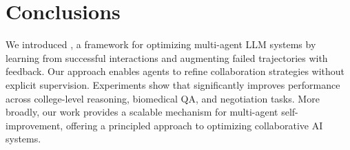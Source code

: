 \section{Conclusions}
We introduced \model{}, a framework for optimizing multi-agent LLM systems by learning from successful interactions and augmenting failed trajectories with feedback. Our approach enables agents to refine collaboration strategies without explicit supervision. Experiments show that \model{} significantly improves performance across college-level reasoning, biomedical QA, and negotiation tasks. More broadly, our work provides a scalable mechanism for multi-agent self-improvement, offering a principled approach to optimizing collaborative AI systems.